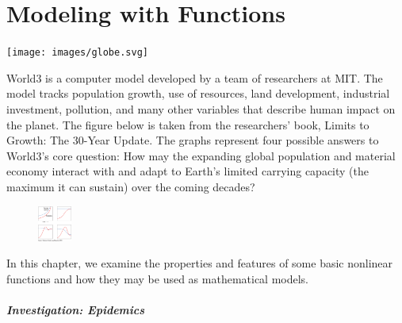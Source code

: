 \documentclass[10pt,]{book}
\theoremstyle{plain}
\theoremstyle{definition}
\theoremstyle{definition}
\numberwithin{equation}{section}
\begin{document}
\chapter[Modeling with Functions]{Modeling with Functions}\label{chap2}
\typeout{************************************************}
\typeout{************************************************}
\texttt{[image: images/globe.svg]}%
\par
World3 is a computer model developed by a team of researchers at MIT. The model tracks population growth, use of resources, land development, industrial investment, pollution, and many other variables that describe human impact on the planet. The figure below is taken from the researchers’ book, Limits to Growth: The 30-Year Update. The graphs represent four possible answers to World3's core question: How may the expanding global population and material economy interact with and adapt to Earth’s limited carrying capacity (the maximum it can sustain) over the coming decades?%
\leavevmode%
\begin{figure}
\centering
\includegraphics[width=0.100\textwidth,]{images/world-population-limits.svg}\end{figure}
\par
In this chapter, we examine the properties and features of some basic nonlinear functions and how they may be used as mathematical models.%
\typeout{************************************************}
\typeout{************************************************}
\paragraph[Investigation: Epidemics]{Investigation: Epidemics}\label{paragraphs-18}
\end{document}
